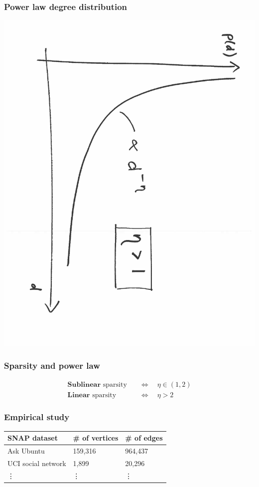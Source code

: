 \documentclass[final,hyperref={pdfpagelabels=false},noamsthm]{beamer}
\begin{document}
\begin{frame}
	\frametitle{Power law degree distribution}
	\includegraphics[angle=90,origin=c,scale=0.37]{fig/powerlaw}
\end{frame}

\begin{frame}
	\frametitle{Sparsity and power law}
	\begin{align*}
	\textbf{Sublinear } \text{sparsity} & \quad \iff \quad  \eta \in (1,2) \\
	\textbf{Linear } \text{sparsity} & \quad \iff \quad \eta > 2
	\end{align*}
\end{frame}

\begin{frame}
	\frametitle{Empirical study}
	\begin{table}[b]
		\label{tab:datasets}
		\begin{center}
			\begin{tabular}{lll}
				SNAP dataset \cite{snapnets} & \# of vertices   & \# of edges    \\
				\hline
				Ask Ubuntu    & 159,316   & 964,437    \\
				UCI social network   & 1,899     & 20,296     \\
				\vdots & \vdots & \vdots
			\end{tabular}
		\end{center}
	\end{table}
	
\end{frame}
\end{document}
